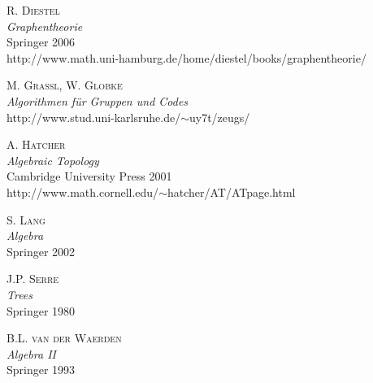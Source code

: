 \documentclass[a4paper, 12pt, twoside]{article}
\begin{document}
\newpage
\begin{thebibliography}{10}

 \textsc{R. Diestel}\\
\textsl{Graphentheorie}\\
Springer 2006\\
\textsf{http://www.math.uni-hamburg.de/home/diestel/books/graphentheorie/}

 \textsc{M. Grassl, W. Globke}\\
\textsl{Algorithmen für Gruppen und Codes}\\
\textsf{http://www.stud.uni-karlsruhe.de/$\sim$uy7t/zeugs/}

 \textsc{A. Hatcher}\\
\textsl{Algebraic Topology}\\
Cambridge University Press 2001\\
\textsf{http://www.math.cornell.edu/$\sim$hatcher/AT/ATpage.html}

 \textsc{S. Lang}\\
\textsl{Algebra}\\
Springer 2002

 \textsc{J.P. Serre}\\
\textsl{Trees}\\
Springer 1980

 \textsc{B.L. van der Waerden}\\
\textsl{Algebra II}\\
Springer 1993

\end{thebibliography}

\newpage
{}
\small
\printindex
\end{document}
